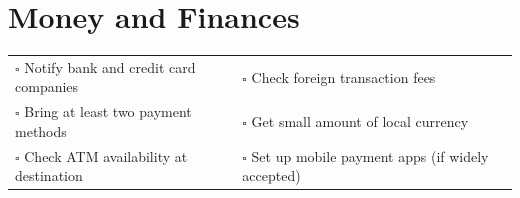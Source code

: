 
\section{Money and Finances}
\label{sec:finance}

\begin{tabular}{p{9cm} p{8cm}}
$\square$ Notify bank and credit card companies & $\square$ Check foreign transaction fees \\ 
$\square$ Bring at least two payment methods & $\square$ Get small amount of local currency \\ 
$\square$ Check ATM availability at destination & $\square$ Set up mobile payment apps (if widely accepted) \\ 
\end{tabular}


